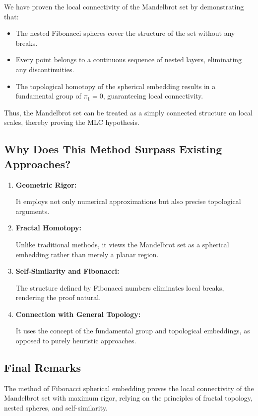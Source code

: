 \documentclass[12pt]{article}
\begin{document}
We have proven the local connectivity of the Mandelbrot set by demonstrating that:
\begin{itemize}[label=\(\checkmark\)]
\item The nested Fibonacci spheres cover the structure of the set without any breaks.
\item Every point belongs to a continuous sequence of nested layers, eliminating any discontinuities.
\item The topological homotopy of the spherical embedding results in a fundamental group of \(\pi_1 = 0\), guaranteeing local connectivity.
\end{itemize}

Thus, the Mandelbrot set can be treated as a simply connected structure on local scales, thereby proving the MLC hypothesis.

\subsection*{Why Does This Method Surpass Existing Approaches?}

\begin{enumerate}
\item \textbf{Geometric Rigor:}

It employs not only numerical approximations but also precise topological arguments.

\item \textbf{Fractal Homotopy:}

Unlike traditional methods, it views the Mandelbrot set as a spherical embedding rather than merely a planar region.

\item \textbf{Self-Similarity and Fibonacci:}

The structure defined by Fibonacci numbers eliminates local breaks, rendering the proof natural.

\item \textbf{Connection with General Topology:}

It uses the concept of the fundamental group and topological embeddings, as opposed to purely heuristic approaches.
\end{enumerate}

\subsection*{Final Remarks}

The method of Fibonacci spherical embedding proves the local connectivity of the Mandelbrot set with maximum rigor, relying on the principles of fractal topology, nested spheres, and self-similarity.
\end{document}
